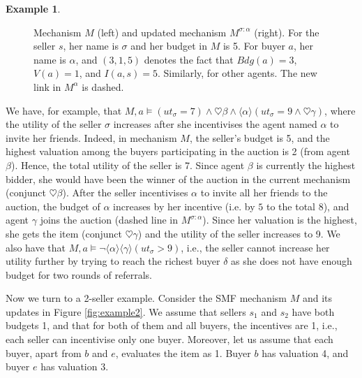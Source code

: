 \documentclass[letterpaper]{article} %
\theoremstyle{definition}
\newtheorem{example}{Example}
\begin{document}
\begin{example}
\begin{figure}[t!]
\caption{Mechanism $M$ (left) and updated mechanism $M^{\sigma:\alpha}$ (right). For the seller $s$, her name is $\sigma$ and her budget in $M$ is 5. For buyer $a$, her name is $\alpha$, and $(3, 1,5)$ denotes the fact that $Bdg(a) = 3$, $V(a) = 1$, and $I(a, s) = 5$. Similarly, for other agents. The new link in $M^\alpha$ is dashed.}
\label{fig:example1}
\end{figure} 
    We have, for example, that $M,a \models (ut_\sigma = 7) \land \heartsuit \beta \land \langle \alpha \rangle (ut_\sigma = 9 \land \heartsuit \gamma)$, where the utility of the seller $\sigma$ increases after she incentivises the agent named $\alpha$ to invite her friends. Indeed, in mechanism $M$, the seller's budget is 5, and the highest valuation among the buyers participating in the auction is 2 (from agent $\beta$). Hence, the total utility of the seller is 7. Since agent $\beta$ is currently the highest bidder, she would have been the winner of the auction in the current mechanism (conjunct $\heartsuit \beta$). After the seller incentivises $\alpha$ to invite all her friends to %
    the auction, the budget of $\alpha$ increases by her incentive (i.e. by $5$ to the total 8), and agent $\gamma$ joins the auction (dashed line in $M^{\sigma:\alpha}$). Since her valuation %
    is the highest, she gets the item (conjunct $\heartsuit \gamma$) and the utility of the seller increases to 9. %
    We also have that $M,a \models \lnot \langle \alpha \rangle \langle \gamma \rangle (ut_\sigma >9 )$, i.e., the seller cannot increase her utility further by trying to reach the richest buyer $\delta$ as she does not have enough budget for two rounds of referrals.

    Now we turn to a 2-seller example. Consider the SMF mechanism $M$ and its updates in Figure \ref{fig:example2}. 
We assume that sellers $s_1$ and $s_2$ have both budgets 1, and that for both of them and all buyers, the incentives are 1, i.e., each seller can incentivise only one %
buyer. Moreover, let us assume that each buyer, apart from $b$ and $e$, evaluates the item as 1. Buyer $b$ has valuation 4, and buyer $e$ has valuation 3.


\end{example}
\end{document}
